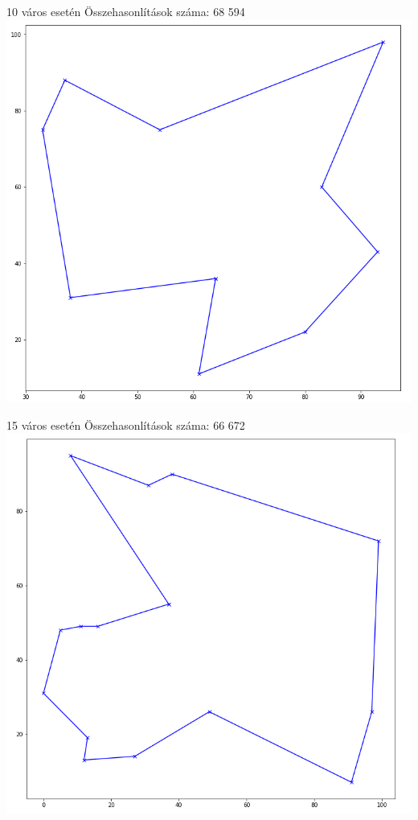10 város esetén
Összehasonlítások száma: 68 594
\includegraphics[scale=0.4]{images/10.png}

15 város esetén
Összehasonlítások száma: 66 672
\includegraphics[scale=0.4]{images/15.png}

